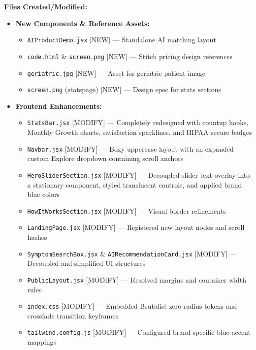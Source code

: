 \documentclass[11pt,a4paper]{article}
\begin{document}
\begin{itemize}
{\textbf{Files Created/Modified:}
\begin{itemize}
  \item \textbf{New Components \& Reference Assets:}
    \begin{itemize}
      \item \texttt{AIProductDemo.jsx} [NEW] --- Standalone AI matching layout
      \item \texttt{code.html} \& \texttt{screen.png} [NEW] --- Stitch pricing design references
      \item \texttt{geriatric.jpg} [NEW] --- Asset for geriatric patient image
      \item \texttt{screen.png} (statspage) [NEW] --- Design spec for stats sections
    \end{itemize}
  \item \textbf{Frontend Enhancements:}
    \begin{itemize}
      \item \texttt{StatsBar.jsx} [MODIFY] --- Completely redesigned with countup hooks, Monthly Growth charts, satisfaction sparklines, and HIPAA secure badges
      \item \texttt{Navbar.jsx} [MODIFY] --- Boxy uppercase layout with an expanded custom Explore dropdown containing scroll anchors
      \item \texttt{HeroSliderSection.jsx} [MODIFY] --- Decoupled slider text overlay into a stationary component, styled translucent controls, and applied brand blue colors
      \item \texttt{HowItWorksSection.jsx} [MODIFY] --- Visual border refinements
      \item \texttt{LandingPage.jsx} [MODIFY] --- Registered new layout nodes and scroll hashes
      \item \texttt{SymptomSearchBox.jsx} \& \texttt{AIRecommendationCard.jsx} [MODIFY] --- Decoupled and simplified UI structures
      \item \texttt{PublicLayout.jsx} [MODIFY] --- Resolved margins and container width rules
      \item \texttt{index.css} [MODIFY] --- Embedded Brutalist zero-radius tokens and crossfade transition keyframes
      \item \texttt{tailwind.config.js} [MODIFY] --- Configured brand-specific blue accent mappings
    \end{itemize}
\end{itemize}

}
\end{itemize}
\end{document}

